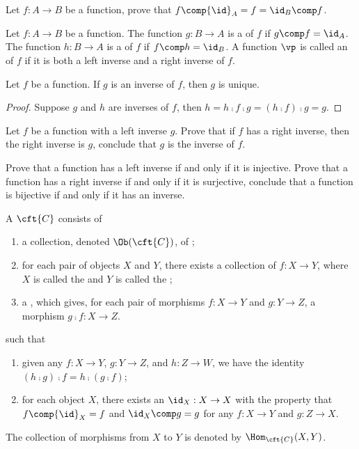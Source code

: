\documentclass[10pt]{article}
\begin{document}
\begin{problem}
    Let $f:A\to B$ be a function, prove that $f\comp{\id}_{A}=f={\id}_{B}\comp f$.
\end{problem}
\begin{definition}
    Let $f:A\to B$ be a function. The function $g:B\to A$ is a  of $f$ if $g\comp f={\id}_{A}$. The function $h:B\to A$ is a  of $f$ if $f\comp h={\id}_{B}$. A function $\vp$ is called an  of $f$ if it is both a left inverse and a right inverse of $f$.
\end{definition}
\begin{proposition}
    Let $f$ be a function. If $g$ is an inverse of $f$, then $g$ is unique.
\end{proposition}
\begin{proof}
    Suppose $g$ and $h$ are inverses of $f$, then $h=h\comp f\comp g=(h\comp f)\comp g=g$.
\end{proof}
\begin{problem}
    Let $f$ be a function with a left inverse $g$. Prove that if $f$ has a right inverse, then the right inverse is $g$, conclude that $g$ is the inverse of $f$.
\end{problem}
\begin{problem}
    Prove that a function has a left inverse if and only if it is injective. Prove that a function has a right inverse if and only if it is surjective, conclude that a function is bijective if and only if it has an inverse.
\end{problem}
\begin{definition}
    A  $\cft{C}$ consists of
    \begin{enumerate}
        \item a collection, denoted $\Ob(\cft{C})$, of ;
        \item for each pair of objects $X$ and $Y$, there exists a collection of  $f:X\to Y$, where $X$ is called the  and $Y$ is called the ;
        \item a , which gives, for each pair of morphisms $f:X\to Y$ and $g:Y\to Z$, a morphism $g\comp f:X\to Z$.
    \end{enumerate}
    such that
    \begin{enumerate}
        \item given any $f:X\to Y$, $g:Y\to Z$, and $h:Z\to W$, we have the identity $(h\comp g)\comp f=h\comp(g\comp f)$;
        \item for each object $X$, there exists an  ${\id}_{X}:X\to X$ with the property that $f\comp{\id}_{X}=f$ and ${\id}_{X}\comp g=g$ for any $f:X\to Y$ and $g:Z\to X$.
    \end{enumerate}
    The collection of morphisms from $X$ to $Y$ is denoted by ${\Hom}_{\cft{C}}(X,Y)$.
\end{definition}
\end{document}
